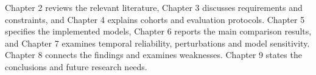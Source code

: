 Chapter 2 reviews the relevant literature, Chapter 3 discusses requirements and constraints, and Chapter 4 explains cohorts and evaluation protocols. Chapter 5 specifies the implemented models, Chapter 6 reports the main comparison results, and Chapter 7 examines temporal reliability, perturbations and model sensitivity. Chapter 8 connects the findings and examines weaknesses. Chapter 9 states the conclusions and future research needs.
